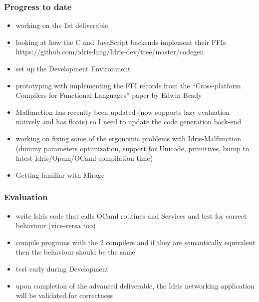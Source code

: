 \documentclass{beamer}
\begin{document}
\begin{frame}
	\frametitle{Progress to date}

	\begin{itemize}
		\item working on the 1st deliverable
		\item looking at how the C and JavaScript backends implement
		      their FFIs https://github.com/idris-lang/Idris-dev/tree/master/codegen
		\item set up the Development Environment
		\item prototyping with implementing the FFI records from the
		      ``Cross-platform Compilers for Functional Languages'' paper
		      by Edwin Brady
		\item Malfunction has recently been updated (now supports
		      lazy evaluation natively and has floats) so I need
		      to update the code generation back-end
		\item working on fixing some of the ergonomic problems with
		      Idris-Malfunction (dummy parameters optimization, support for Unicode,
		      primitives, bump to latest Idris/Opam/OCaml compilation time)
		\item Getting familiar with Mirage
	\end{itemize}

\end{frame}


\begin{frame}
	\frametitle{Evaluation}

	\begin{itemize}
		\item write Idris code that calls OCaml routines and Services
		      and test for correct behaviour (vice-versa too)
		\item compile programs with the 2 compilers and if
		      they are semantically equivalent then the behaviour should
		      be the same
		\item test early during Development
		\item upon completion of the advanced deliverable,
		      the Idris networking application will be validated for
		      correctness
	\end{itemize}
\end{frame}
\end{document}
